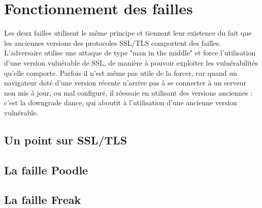 \section{Fonctionnement des failles}


Les deux failles utilisent le m\^eme principe et tiennent leur existence du fait que les anciennes versions des protocoles SSL/TLS comportent des failles. L'adversaire utilise une attaque de type "man in the middle" et force l'utilisation d'une version vulnérable de SSL, de manière à pouvoir exploiter les vulnérabilités qu'elle comporte. Parfois il n'est m\^eme pas utile de la forcer, car quand un navigateur doté d’une version récente n’arrive pas à se connecter à un serveur non mis à jour, ou mal configuré, il réessaie en utilisant des versions anciennes : c’est la downgrade dance, qui aboutit à l'utilisation d'une ancienne version vulnérable.


\subsection{Un point sur SSL/TLS}



\subsection{La faille Poodle}

\subsection{La faille Freak}


